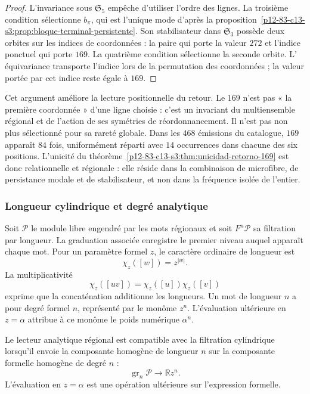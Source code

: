\begin{proof}
L'invariance sous \(\mathfrak S_5\) empêche d'utiliser l'ordre des lignes. La
troisième condition sélectionne \(b_\pi\), qui est l'unique mode d'après la
proposition~\ref{p12-83-c13-s3:prop:bloque-terminal-persistente}. Son stabilisateur dans
\(\mathfrak S_3\) possède deux orbites sur les indices de coordonnées :
la paire qui porte la valeur \(272\) et l'indice ponctuel qui porte
\(169\). La quatrième condition sélectionne la seconde orbite. L'
équivariance transporte l'indice lors de la permutation des coordonnées ; la
valeur portée par cet indice reste égale à \(169\).
\end{proof}

Cet argument améliore la lecture positionnelle du retour. Le \(169\) n'est pas « la première coordonnée » d'une ligne choisie : c'est un invariant du multiensemble régional et de l'action de ses symétries de réordonnancement. Il n'est pas non plus sélectionné pour sa rareté globale. Dans les \(468\) émissions du catalogue, \(169\) apparaît \(84\) fois, uniformément réparti avec \(14\) occurrences dans chacune des six positions. L'unicité du théorème~\ref{p12-83-c13-s3:thm:unicidad-retorno-169} est donc relationnelle et régionale : elle réside dans la combinaison de microfibre, de persistance modale et de stabilisateur, et non dans la fréquence isolée de l'entier.

\subsubsection{Longueur cylindrique et degré analytique}

Soit \(\mathcal P\) le module libre engendré par les mots régionaux et
soit \(F^n\mathcal P\) sa filtration par longueur. La graduation associée
enregistre le premier niveau auquel apparaît chaque mot. Pour un paramètre
formel \(z\), le caractère ordinaire de longueur est
\[
\chi_z([w])=z^{|w|}.
\]
La multiplicativité
\[
\chi_z([uv])=\chi_z([u])\chi_z([v])
\]
exprime que la concaténation additionne les longueurs. Un mot de longueur
\(n\) a pour degré formel \(n\), représenté par le monôme \(z^n\).
L'évaluation ultérieure en \(z=\alpha\) attribue à ce monôme le poids
numérique \(\alpha^n\).

\begin{definition}
\label{p12-83-c13-s3:def:compatibilidad-grado}
Le lecteur analytique régional est compatible avec la filtration cylindrique
lorsqu'il envoie la composante homogène de longueur \(n\) sur la composante
formelle homogène de degré \(n\) :
\[
\operatorname{gr}_n\mathcal P\longrightarrow
\mathbb R z^n.
\]
L'évaluation en \(z=\alpha\) est une opération ultérieure sur
l'expression formelle.
\end{definition}

